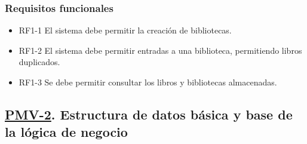 \subsubsection{Requisitos funcionales}
\begin{itemize}
    \item RF1-1 El sistema debe permitir la creación de bibliotecas.
    \item RF1-2 El sistema debe permitir entradas a una biblioteca, permitiendo libros duplicados.
    \item RF1-3 Se debe permitir consultar los libros y bibliotecas almacenadas.
\end{itemize}

\subsection{\href{https://github.com/Anglepi/My-Many-Reads/milestone/3}{PMV-2}. Estructura de datos básica y base de la lógica de negocio}